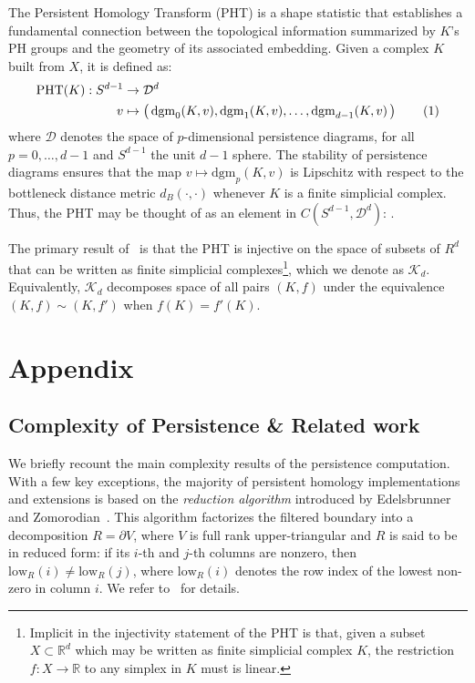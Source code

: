 \documentclass[12pt]{article}
\numberwithin{equation}{section}
\newcommand{\+}{%
	\raisebox{0.18ex}{\scaleobj{0.55}{+}}
}
\theoremstyle{definition}
\newcommand\numberthis{\addtocounter{equation}{1}\tag{\theequation}}
\begin{document}
The Persistent Homology Transform (PHT) is a shape statistic that establishes a fundamental connection between the topological information summarized by $K$'s PH groups and the geometry of its associated embedding. Given a complex $K$ built from $X$, it is defined as: 
\begin{align*}\label{eq:pht}
	\mathrm{PHT}(K): S^{d-1} &\to \mathcal{D}^d \\
	v &\mapsto \left( \, \mathrm{dgm}_0(K, v), \mathrm{dgm}_1(K, v), \dots, \mathrm{dgm}_{d-1}(K, v) \, \right)\numberthis
\end{align*}
where $\mathcal{D}$ denotes the space of $p$-dimensional persistence diagrams, for all $p = 0, \dots, d-1$ and $S^{d-1}$ the unit $d-1$ sphere. The stability of persistence diagrams ensures that the map $v \mapsto \mathrm{dgm}_p(K, v)$ is Lipschitz with respect to the bottleneck distance metric $d_B(\cdot, \cdot)$ whenever $K$ is a finite simplicial complex. 
Thus, the PHT may be thought of as an element in $C(S^{d-1}, \mathcal{D}^d)$: . 


The primary result of~\cite{} is that the PHT is injective on the space of subsets of $R^d$ that can be written as finite simplicial complexes\footnote{Implicit in the injectivity statement of the PHT is that, given a subset $X \subset \mathbb{R}^d$ which may be written as finite simplicial complex $K$, the restriction $f: X \to \mathbb{R}$ to any simplex in $K$ must is linear.}, which we denote as $\mathcal{K}_d$. 
Equivalently, $\mathcal{K}_d$ decomposes space of all pairs $(K, f)$ under the equivalence $(K, f) \sim (K,f')$ when $f(K) = f'(K)$.

 

\appendix
\section{Appendix}

\subsection{Complexity of Persistence \& Related work}
We briefly recount the main complexity results of the persistence computation. 
With a few key exceptions, the majority of persistent homology implementations and extensions is based on the \emph{reduction algorithm} introduced by Edelsbrunner and Zomorodian~\cite{edelsbrunner2000topological}. 
This algorithm factorizes the filtered boundary into a decomposition $R = \partial V$, where $V$ is full rank upper-triangular and $R$ is said to be in reduced form: if its $i$-th and $j$-th columns are nonzero, then $\mathrm{low}_R(i) \neq \mathrm{low}_R(j)$, where $\mathrm{low}_R(i)$ denotes the row index of the lowest non-zero in column $i$. 
We refer to~\cite{edelsbrunner2000topological, bauer2020persistence, dey2022computational} for details. 
\end{document}

